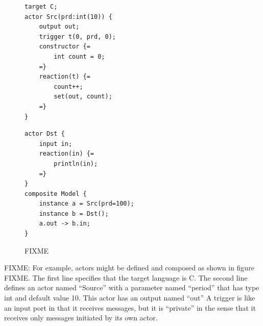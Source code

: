 \documentclass[sigconf]{acmart}
\begin{document}
\begin{figure}[ht]
 \centering
\begin{minipage}{0.50\linewidth}
\begin{lstlisting}[language=LF]
target C;
actor Src(prd:int(10)) {
	output out;
	trigger t(0, prd, 0);
	constructor {=
		int count = 0;
	=}
	reaction(t) {=
		count++;
		set(out, count);
	=}
}
\end{lstlisting}
\end{minipage}%
\begin{minipage}{0.50\linewidth}
\begin{lstlisting}[firstnumber=13]
actor Dst {
	input in;
	reaction(in) {=
		println(in);
	=}
}
composite Model {
	instance a = Src(prd=100);
	instance b = Dst();
	a.out -> b.in;
}
\end{lstlisting}
\end{minipage}
 \caption{FIXME}
 \label{fig:lf-compiler}
\end{figure}

FIXME:
For example, actors might be defined and composed as shown in figure FIXME.
The first line specifies that the target language is C.
The second line defines an actor named ``Source'' with a parameter named ``period'' that has type int and default value 10.
This actor has an output named ``out''
	A trigger is like an input port in that it receives messages, but it is ``private'' in the sense that it receives only messages initiated by its own actor.
\end{document}
